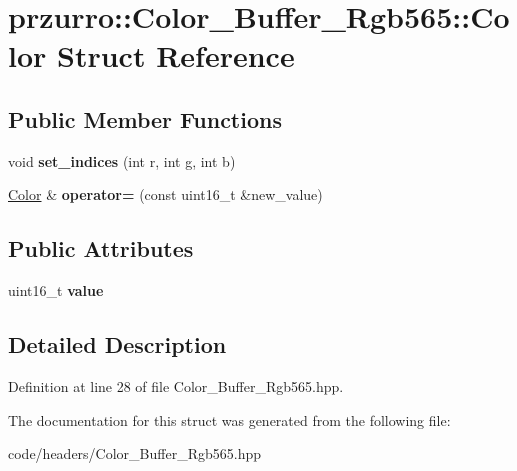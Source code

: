 \hypertarget{structprzurro_1_1_color___buffer___rgb565_1_1_color}{}\section{przurro\+::Color\+\_\+\+Buffer\+\_\+\+Rgb565\+::Color Struct Reference}
\label{structprzurro_1_1_color___buffer___rgb565_1_1_color}
\subsection*{Public Member Functions}
\begin{DoxyCompactItemize}
\item 
\mbox{\label{structprzurro_1_1_color___buffer___rgb565_1_1_color_a85c148bfdec708ac2756e0332a852168}} 
void {\bfseries set\+\_\+indices} (int r, int g, int b)
\item 
\mbox{\label{structprzurro_1_1_color___buffer___rgb565_1_1_color_a3e10b111951904207211f1a4657bc6e0}} 
\mbox{\hyperlink{structprzurro_1_1_color___buffer___rgb565_1_1_color}{Color}} \& {\bfseries operator=} (const uint16\+\_\+t \&new\+\_\+value)
\end{DoxyCompactItemize}
\subsection*{Public Attributes}
\begin{DoxyCompactItemize}
\item 
\mbox{\label{structprzurro_1_1_color___buffer___rgb565_1_1_color_ab088fb5a0caf9feb0941ec6e6d8aa19f}} 
uint16\+\_\+t {\bfseries value}
\end{DoxyCompactItemize}


\subsection{Detailed Description}


Definition at line 28 of file Color\+\_\+\+Buffer\+\_\+\+Rgb565.\+hpp.



The documentation for this struct was generated from the following file\+:\begin{DoxyCompactItemize}
\item 
code/headers/Color\+\_\+\+Buffer\+\_\+\+Rgb565.\+hpp\end{DoxyCompactItemize}
